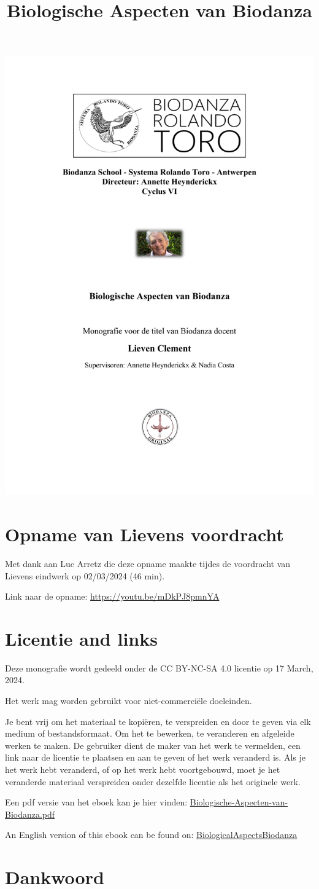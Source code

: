 \documentclass[
  11pt,
]{book}
\title{Biologische Aspecten van Biodanza}
\author{}
\date{\vspace{-2.5em}}
\renewcommand{\maketitle}{
\begin{center}\includegraphics[width=1\linewidth]{./figs/titlePage} \end{center}
\newpage
\frontmatter
\pagenumbering{roman}
}
\begin{document}
\maketitle

{
\hypersetup{linkcolor=}
\setcounter{tocdepth}{2}
\tableofcontents
}
\hypertarget{opname-van-lievens-voordracht}{%
\chapter*{Opname van Lievens voordracht}\label{opname-van-lievens-voordracht}}

Met dank aan Luc Arretz die deze opname maakte tijdes de voordracht van Lievens eindwerk op 02/03/2024 (46 min).

Link naar de opname: \url{https://youtu.be/mDkPJ8pmnYA}

\hypertarget{licentie-and-links}{%
\chapter*{Licentie and links}\label{licentie-and-links}}

Deze monografie wordt gedeeld onder de CC BY-NC-SA 4.0 licentie op 17 March, 2024.

Het werk mag worden gebruikt voor niet-commerciële doeleinden.

Je bent vrij om het materiaal te kopiëren, te verspreiden en door te geven via elk medium of bestandsformaat. Om het te bewerken, te veranderen en afgeleide werken te maken. De gebruiker dient de maker van het werk te vermelden, een link naar de licentie te plaatsen en aan te geven of het werk veranderd is. Als je het werk hebt veranderd, of op het werk hebt voortgebouwd, moet je het veranderde materiaal verspreiden onder dezelfde licentie als het originele werk.

Een pdf versie van het eboek kan je hier vinden: \href{https://biodanzabrugge.be/biologischeAspectenBiodanza/Biologische-Aspecten-van-Biodanza.pdf}{Biologische-Aspecten-van-Biodanza.pdf}

An English version of this ebook can be found on: \href{https://biodanzabrugge.be/biologicalAspectsBiodanza/}{BiologicalAspectsBiodanza}

\mainmatter

\hypertarget{dankwoord}{%
\chapter*{Dankwoord}\label{dankwoord}}
\end{document}
